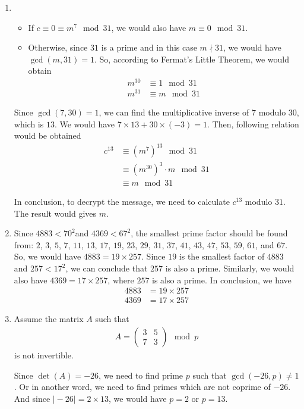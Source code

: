 \documentclass[11pt,a4paper]{article}
\begin{document}
\begin{enumerate}
	\item
		\begin{itemize}
			\item If $c \equiv 0 \equiv m^{7} \mod 31$, we would also have $m \equiv 0 \mod 31$.
			\item Otherwise, since $31$ is a prime and in this case $m \nmid 31$, we would have $\gcd(m, 31) = 1$. So, according to Fermat's Little Theorem, we would obtain
				\begin{align*}
					m^{30} &\equiv 1 \mod 31 \\
					m^{31} &\equiv m \mod 31
				\end{align*}
		\end{itemize}
	\par Since $\gcd(7, 30) = 1$, we can find the multiplicative inverse of $7$ modulo $30$, which is $13$. We would have $7 \times 13 + 30 \times (-3) = 1$. Then, following relation would be obtained
		\begin{align*}
			c^{13} &\equiv (m^{7})^{13} \mod 31 \\
			&\equiv (m^{30})^{3} \cdot m \mod 31 \\
			&\equiv m \mod 31
		\end{align*}
	\par In conclusion, to decrypt the message, we need to calculate $c^{13}$ modulo $31$. The result would gives $m$.

	\item Since $4883 < 70^{2}$and $4369 < 67^{2}$, the smallest prime factor should be found from: $2$, $3$, $5$, $7$, $11$, $13$, $17$, $19$, $23$, $29$, $31$, $37$, $41$, $43$, $47$, $53$, $59$, $61$, and $67$. So, we would have $4883 = 19 \times 257$. Since $19$ is the smallest factor of $4883$ and $257 < 17^{2}$, we can conclude that $257$ is also a prime. Similarly, we would also have $4369 = 17 \times 257$, where $257$ is also a prime. In conclusion, we have
		\begin{align*}
			4883 &= 19 \times 257 \\
			4369 &= 17 \times 257
		\end{align*}

	\item Assume the matrix $A$ such that
		\begin{align*}
			A = \begin{pmatrix} 3 & 5 \\ 7 & 3 \end{pmatrix} \mod p
		\end{align*}
		is not invertible.
	\par Since $\det(A) = -26$, we need to find prime $p$ such that $\gcd(-26, p) \neq 1$. Or in another word, we need to find primes which are not coprime of $-26$. And since $\vert -26 \vert = 2 \times 13$, we would have $p = 2$ or $p = 13$.


\end{enumerate}
\end{document}

